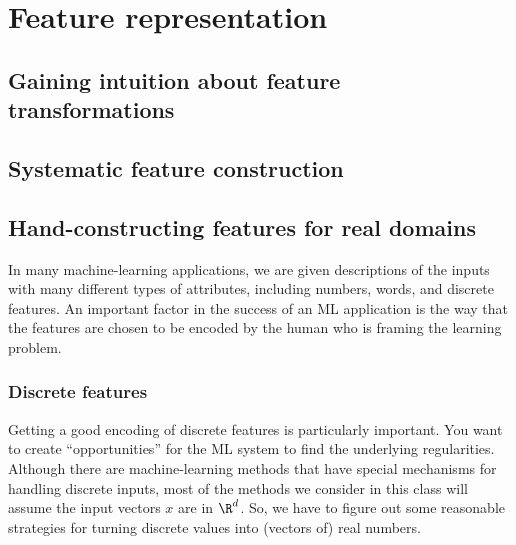 
        
\chapter{Feature representation}
\label{chap:features}
\section{Gaining intuition about feature transformations}
\section{Systematic feature construction}
\section{Hand-constructing features for real domains}

\label{handBuiltFeatures}
In many machine-learning applications, we are given descriptions of
the inputs with many different types of attributes, including numbers,
words, and discrete features.  An important factor in the success of
an ML application is the way that the features are chosen to be encoded
by the human who is framing the learning problem.  

\subsection{Discrete features}
Getting a good encoding of discrete features is particularly
important.  You want to create ``opportunities'' for the ML system to
find the underlying regularities.  Although there are machine-learning
methods that have special mechanisms for handling discrete inputs,
most of
the methods we consider in this class will assume the input vectors
$x$ are in $\R^d$.  So, we have to figure out some reasonable
strategies for turning discrete values into (vectors of) real numbers.

